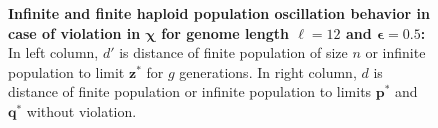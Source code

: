 \begin{figure}[h]
\begin{center}
\hspace{-3em}%
\vspace{-0.5em} \hspace{-3em}%


\caption[\textbf{Infinite and finite haploid population oscillation behavior in case of violation in $\bm{\chi}$ for genome length $\ell = 12$ and $\bm{\epsilon} = 0.5$}]{\textbf{Infinite and finite haploid population oscillation behavior in case of violation in $\bm{\chi}$ for genome length $\ell = 12$ and $\bm{\epsilon} = 0.5$:} 
  In left column, $d'$ is distance of finite population of size $n$ or infinite population to limit $\bm{z}^\ast$ for $g$ generations. In right column, $d$ is distance of finite population or infinite population to limits $\bm{p}^\ast$ and $\bm{q}^\ast$ without violation.}
\label{oscillation_12h_vio_chi_0.5}
\end{center}
\end{figure}

